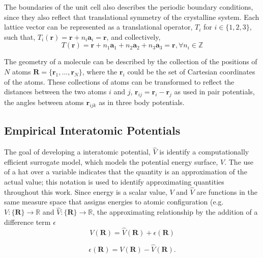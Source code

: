 The boundaries of the unit cell also describes the periodic boundary conditions, since they also reflect that translational symmetry of the crystalline system.
Each lattice vector can be represented as a translational operator, $T_i$ for ${i\in\{1,2,3\}}$, such that, $T_i(\bm{r})=\bm{r} + n_i \bm{a}_i = \bm{r}$, and collectively,  
\begin{equation}
    T(\bm{r}) = \bm{r}
		    + n_1 \bm{a}_1
		    + n_2 \bm{a}_2
		    + n_3 \bm{a}_3 = \bm{r}, \forall n_i \in \mathbb{Z}
\end{equation}

The geometry of a molecule can be described by the collection of the positions of $N$ atoms
	$\bm{R} = \{\bm{r}_1,...,\bm{r}_N\}$,
	where the $\bm{r}_i$ could be the set of Cartesian coordinates of the atoms.
These collections of atoms can be transformed to reflect the distances between the two atoms $i$ and $j$,
	$\bm{r}_{ij}=\bm{r}_i - \bm{r}_j$
	as used in pair potentials, the angles between atoms $\bm{r}_{ijk}$ as in three body potentials.
\\
\subsection{Empirical Interatomic Potentials}
The goal of developing a interatomic potential, $\hat{V}$ is identify a computationally efficient surrogate model, which models the potential energy surface, $V$. 
The use of a hat over a variable indicates that the quantity is an approximation of the actual value; this notation is used to identify approximating quantities throughout this work.
Since energy is a scalar value, $V$ and $\hat{V}$ are functions in the same measure space that assigns energies to atomic configuration (e.g. 
${V:\{\bm{R}\}\rightarrow \mathbb{R}}$ 
and 
${\hat{V}:\{\bm{R}\} \rightarrow \mathbb{R}}$, 
the approximating relationship by the addition of a difference term $\epsilon$
\begin{equation}\label{eq:pes_approximation}
  V(\bm{R}) = \hat{V}(\bm{R}) + \epsilon(\bm{R})
\end{equation}

\begin{equation}\label{eq:error_function_pes}
	\epsilon(\bm{R})=V(\bm{R})-\hat{V}(\bm{R}).
\end{equation}

